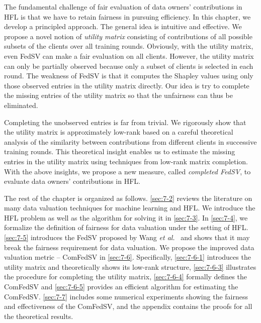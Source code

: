 The fundamental challenge of fair evaluation of data owners' contributions in HFL is that we have to retain fairness in pursuing efficiency. In this chapter, we develop a principled approach. The general idea is intuitive and effective.  We propose a novel notion of \emph{utility matrix} consisting of contributions of all possible subsets of the clients over all training rounds. Obviously, with the utility matrix, even FedSV can make a fair evaluation on all clients.  However, the utility matrix can only be partially observed because only a subset of clients is selected in each round. The weakness of FedSV is that it computes the Shapley values using only those observed entries in the utility matrix directly. Our idea is try to complete the missing entries of the utility matrix so that the unfairness can thus be eliminated. 

Completing the unobserved entries is far from trivial. We rigorously show that the utility matrix is approximately low-rank based on a careful theoretical analysis of the similarity between contributions from different clients in successive training rounds. This theoretical insight enables us to estimate the missing entries in the utility matrix using techniques from low-rank matrix completion.  With the above insights, we propose a new measure, called \emph{completed FedSV}, to evaluate data owners' contributions in HFL. 

The rest of the chapter is organized as follows. \autoref{sec:7-2} reviews the literature on many data valuation techniques for machine learning and HFL. We introduce the HFL problem as well as the algorithm for solving it in \autoref{sec:7-3}. In \autoref{sec:7-4}, we formalize the definition of fairness for data valuation under the setting of HFL. \autoref{sec:7-5} introduces the FedSV proposed by Wang \textit{et al.}~\cite{wang2020principled} and shows that it may break the fairness requirement for data valuation. We propose the improved data valuation metric -- ComFedSV in \autoref{sec:7-6}. Specifically, \autoref{sec:7-6-1} introduces the utility matrix and theoretically shows its low-rank structure, \autoref{sec:7-6-3} illustrates the procedure for completing the utility matrix, \autoref{sec:7-6-4} formally defines the ComFedSV and \autoref{sec:7-6-5} provides an efficient algorithm for estimating the ComFedSV. \autoref{sec:7-7} includes some numerical experiments showing the fairness and effectiveness of the ComFedSV, and the appendix contains the proofs for all the theoretical results. 

